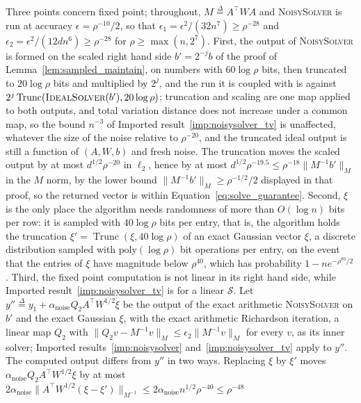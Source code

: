 \documentclass[11pt]{article}
\newcommand{\Trunc}{\operatorname{Trunc}}
\newcommand{\defeq}{\stackrel{\Delta}{=}}
\begin{document}
Three points concern fixed point; throughout, $M \defeq A^\top W A$ and
\textsc{NoisySolver} is run at accuracy $\epsilon = \rho^{-10} / 2$, so that
$\epsilon_1 = \epsilon^{2} / (32 n^{7}) \ge \rho^{-28}$ and
$\epsilon_2 = \epsilon^{2} / (12 d n^{6}) \ge \rho^{-28}$ for
$\rho \ge \max(n, 2^{7})$.
First, the output of \textsc{NoisySolver} is formed on the scaled right hand
side $b' = 2^{-j} b$ of the proof of Lemma~\ref{lem:sampled_maintain}, on
numbers with $60 \log \rho$ bits, then truncated to
$20 \log \rho$ bits and multiplied by
$2^{j}$, and the run it is coupled with is against
$2^{j} \Trunc(\textsc{IdealSolver}(b'), 20 \log \rho)$; truncation and scaling
are one map applied to both outputs, and total variation distance does not
increase under a common map, so the bound $n^{-3}$ of Imported
result~\ref{imp:noisysolver_tv} is unaffected, whatever the size of the noise
relative to $\rho^{-20}$, and the truncated ideal output is still a function of
$(A, W, b)$ and fresh noise.
The truncation moves the scaled output by at most $d^{1/2} \rho^{-20}$ in
$\ell_2$, hence by at most
$d^{1/2} \rho^{-19.5} \le \rho^{-18} \|M^{-1} b'\|_{M}$ in the
$M$ norm, by the lower bound
$\|M^{-1} b'\|_{M} \ge \rho^{-1/2} / 2$ displayed in that proof, so the returned
vector is within Equation~\eqref{eq:solve_guarantee}.
Second, $\xi$ is the only place the algorithm needs randomness of more than
$O(\log n)$ bits per row: it is sampled with
$40 \log \rho$ bits per entry, that is, the algorithm holds the truncation
$\xi' = \Trunc(\xi, 40 \log \rho)$ of an exact Gaussian vector
$\xi$, a discrete distribution sampled with
$\mathrm{poly}(\log \rho)$ bit operations per entry, on the event that the
entries of $\xi$ have magnitude below
$\rho^{40}$, which has probability
$1 - n e^{-\rho^{80} / 2}$.
Third, the fixed point computation is not linear in its right hand side, while
Imported result~\ref{imp:noisysolver_tv} is for a linear $\mathcal{S}$.
Let $y'' \defeq y_1 + \alpha_{\mathrm{noise}} Q_2 A^\top W^{1/2} \xi$ be the
output of the exact arithmetic \textsc{NoisySolver} on $b'$ and the exact
Gaussian $\xi$, with the exact arithmetic Richardson iteration, a linear map
$Q_2$ with
$\|Q_2 v - M^{-1} v\|_{M} \le \epsilon_2 \|M^{-1} v\|_{M}$ for every
$v$, as its inner solver; Imported results~\ref{imp:noisysolver}
and~\ref{imp:noisysolver_tv} apply to $y''$.
The computed output differs from $y''$ in two ways.
Replacing $\xi$ by
$\xi'$ moves
$\alpha_{\mathrm{noise}} Q_2 A^\top W^{1/2} \xi$ by at most
$2 \alpha_{\mathrm{noise}} \|A^\top W^{1/2} (\xi - \xi')\|_{M^{-1}} \le 2 \alpha_{\mathrm{noise}} n^{1/2} \rho^{-40} \le \rho^{-48}$
\end{document}
